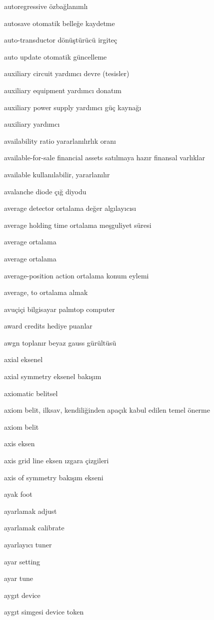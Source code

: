 \documentclass[12pt,fleqn]{article}\usepackage{../../common}
\begin{document}
autoregressive özbağlanımlı

autosave otomatik belleğe kaydetme

auto-transductor dönüştürücü irgiteç

auto update otomatik güncelleme

auxiliary circuit yardımcı devre (tesisler)

auxiliary equipment yardımcı donatım

auxiliary power supply yardımcı güç kaynağı

auxiliary yardımcı

availability ratio yararlanılırlık oranı

available-for-sale financial assets satılmaya hazır finansal varlıklar

available kullanılabilir, yararlanılır

avalanche diode çığ diyodu

average detector ortalama değer algılayıcısı

average holding time ortalama meşguliyet süresi

average ortalama

average ortalama

average-position action ortalama konum eylemi

average, to ortalama almak

avuçiçi bilgisayar palmtop computer

award credits hediye puanlar

awgn toplanır beyaz gauss gürültüsü

axial eksenel

axial symmetry eksenel bakışım

axiomatic belitsel

axiom belit, ilksav, kendiliğinden apaçık kabul edilen temel önerme

axiom belit

axis eksen

axis grid line eksen ızgara çizgileri

axis of symmetry bakışım ekseni

ayak foot

ayarlamak adjust

ayarlamak calibrate

ayarlayıcı tuner

ayar setting

ayar tune

aygıt device

aygıt simgesi device token
\end{document}
